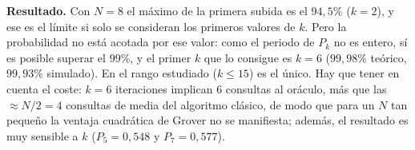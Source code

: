 \textbf{Resultado.} Con $N=8$ el máximo de la primera subida es el $94{,}5\%$ ($k=2$), y ese es el límite si solo se consideran los primeros valores de $k$. Pero la probabilidad no está acotada por ese valor: como el periodo de $P_k$ no es entero,
sí es posible superar el $99\%$, y el primer $k$ que lo consigue es $k=6$ ($99{,}98\%$ teórico, $99{,}93\%$ simulado). En el rango estudiado ($k\le15$) es el único. Hay que tener en cuenta el coste: $k=6$ iteraciones implican 6 consultas al oráculo, más que las $\approx N/2=4$
consultas de media del algoritmo clásico, de modo que para un $N$ tan pequeño la ventaja cuadrática de Grover no se manifiesta; además, el resultado es muy sensible a $k$ ($P_5=0{,}548$ y $P_7=0{,}577$).